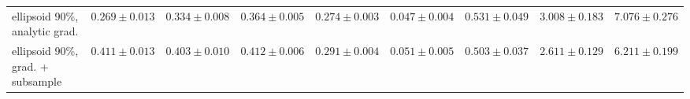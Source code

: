 \begin{table}[t]
{\begin{tabular}{l cccc cccc}
ellipsoid 90\%, analytic grad. & $0.269 \pm {\scriptstyle 0.013}$ & $0.334 \pm {\scriptstyle 0.008}$ & $0.364 \pm {\scriptstyle 0.005}$ & $0.274 \pm {\scriptstyle 0.003}$ & $0.047 \pm {\scriptstyle 0.004}$ & $0.531 \pm {\scriptstyle 0.049}$ & $3.008 \pm {\scriptstyle 0.183}$ & $7.076 \pm {\scriptstyle 0.276}$ \\
ellipsoid 90\%, grad. + subsample & $0.411 \pm {\scriptstyle 0.013}$ & $0.403 \pm {\scriptstyle 0.010}$ & $0.412 \pm {\scriptstyle 0.006}$ & $0.291 \pm {\scriptstyle 0.004}$ & $0.051 \pm {\scriptstyle 0.005}$ & $0.503 \pm {\scriptstyle 0.037}$ & $2.611 \pm {\scriptstyle 0.129}$ & $6.211 \pm {\scriptstyle 0.199}$ \\
\bottomrule
\end{tabular}
}
\end{table}
